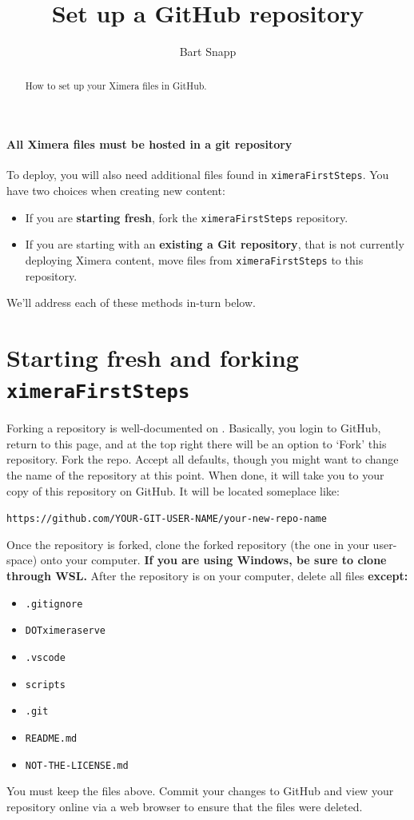 \documentclass{ximera}
\title{Set up a GitHub repository}
\author{Bart Snapp}
\begin{document}
\begin{abstract}
  How to set up your Ximera files in GitHub.
\end{abstract}
\maketitle

\paragraph{All Ximera files must be hosted in a git repository} To deploy, you will also need  additional
files found in \verb!ximeraFirstSteps!. You have two choices when creating new
content:
\begin{itemize}
  \item If you are \textbf{starting fresh}, fork the \texttt{ximeraFirstSteps}
        repository.
  \item If you are starting with an \textbf{existing a Git repository}, that is
        not currently deploying Ximera content, move files
        from \texttt{ximeraFirstSteps} to this repository.
\end{itemize}
We'll address each of these methods in-turn below.

\section{Starting fresh and forking \texttt{ximeraFirstSteps}}

Forking a repository is well-documented on
.
Basically, you login to GitHub, return to this page, and at the top right there
will be an option to `Fork' this repository. Fork the repo. Accept all
defaults, though you might want to change the name of the repository at this
point. When done, it will take you to
your copy of this repository on GitHub. It will be located someplace like:
\begin{center}
  \texttt{https://github.com/YOUR-GIT-USER-NAME/your-new-repo-name}
\end{center}
Once the repository is forked, clone the forked repository (the one in your
user-space) onto your computer. \textbf{If you are using Windows, be sure to
  clone through WSL.}
After the repository is on your computer, delete all files \textbf{except:}
\begin{itemize}
  \item \texttt{.gitignore}
  \item \texttt{DOTximeraserve}
  \item \texttt{.vscode}
  \item \texttt{scripts}
  \item \texttt{.git}
  \item \texttt{README.md}
  \item \texttt{NOT-THE-LICENSE.md}
\end{itemize}
You must keep the files above.	Commit your changes to GitHub and view your
repository online via a web browser to ensure that the files were deleted.
\end{document}
